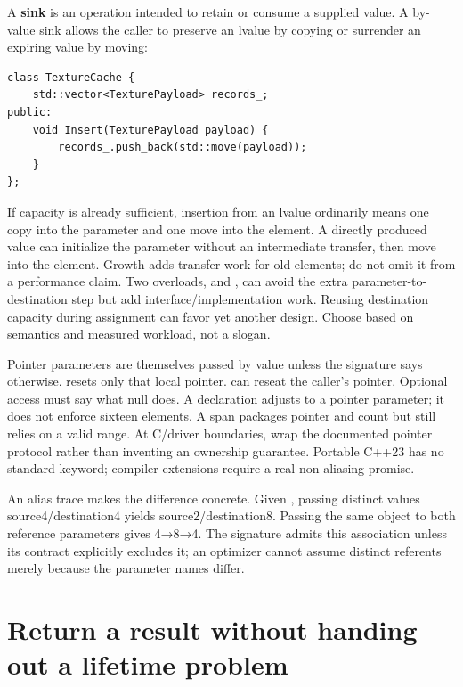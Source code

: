 A \textbf{sink} is an operation intended to retain or consume a supplied value. A by-value sink allows the caller to preserve an lvalue by copying or surrender an expiring value by moving:

\begin{verbatim}
class TextureCache {
    std::vector<TexturePayload> records_;
public:
    void Insert(TexturePayload payload) {
        records_.push_back(std::move(payload));
    }
};
\end{verbatim}

If capacity is already sufficient, insertion from an lvalue ordinarily means one copy into the parameter and one move into the element. A directly produced value can initialize the parameter without an intermediate transfer, then move into the element. Growth adds transfer work for old elements; do not omit it from a performance claim. Two overloads,  and , can avoid the extra parameter-to-destination step but add interface/implementation work. Reusing destination capacity during assignment can favor yet another design. Choose based on semantics and measured workload, not a slogan.

Pointer parameters are themselves passed by value unless the signature says otherwise.  resets only that local pointer.  can reseat the caller's pointer. Optional access must say what null does. A declaration  adjusts to a pointer parameter; it does not enforce sixteen elements. A span packages pointer and count but still relies on a valid range. At C/driver boundaries, wrap the documented pointer protocol rather than inventing an ownership guarantee. Portable C++23 has no standard  keyword; compiler extensions require a real non-aliasing promise.

An alias trace makes the difference concrete. Given , passing distinct values source4/destination4 yields source2/destination8. Passing the same object to both reference parameters gives 4→8→4. The signature admits this association unless its contract explicitly excludes it; an optimizer cannot assume distinct referents merely because the parameter names differ.

\section{Return a result without handing out a lifetime problem}\label{05-engine-i-ch003-return-a-result-without-handing-out-a-lifetime-problem}

